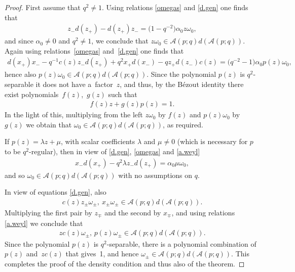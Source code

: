 \documentclass[10pt,a4paper]{amsart}
\numberwithin{equation}{section}
\def\AWeyl#1#2{{\mathcal{A}}(#1;#2)}
\begin{document}
\begin{proof}
First assume that $q^2\neq 1$. Using relations \eqref{omegas} and \eqref{d.gen} one f\/inds that
\begin{gather*}
z_-d(z_+) - d(z_+)z_- = \big(1-q^{-2}\big)\alpha_0 z\omega_0,
\end{gather*}
and since $\alpha_0 \neq 0$ and $q^2\neq 1$, we conclude that $z\omega_0 \in \AWeyl p q d (\AWeyl p q )$. Again using rela\-tions~\eqref{omegas} and~\eqref{d.gen} one f\/inds that
\begin{gather*}
d(x_+)x_- - q^{-1}c(z)z_-d(z_+) + q^2 x_+d(x_-) - qz_+ d(z_-)c(z) = \big(q^{-2}-1\big)\alpha_0 p(z)\omega_0,
\end{gather*}
hence also $p(z)\omega_0 \in \AWeyl p q d (\AWeyl p q )$. Since the polynomial $p(z)$ is $q^2$-separable it does not have a~factor~$z$, and thus, by the B\'ezout identity there exist polynomials~$f(z)$,~$g(z)$ such that
\begin{gather*}
f(z)z +g(z)p(z) = 1.
\end{gather*}
In the light of this, multiplying from the left $z\omega_0$ by $f(z)$ and $p(z)\omega_0$ by $g(z)$ we obtain that $\omega_0 \in \AWeyl p q d (\AWeyl p q )$, as required.

If $p(z)= \lambda z +\mu$, with scalar coef\/f\/icients $\lambda$ and $\mu\neq 0$ (which is necessary for $p$ to be $q^2$-regular), then in view of \eqref{d.gen}, \eqref{omegas} and \eqref{a.weyl}
\begin{gather*}
x_- d(x_+) - q^2\lambda z_-d(z_+) = \alpha_0\mu \omega_0,
\end{gather*}
and so $\omega_0 \in \AWeyl p q d (\AWeyl p q )$ with no assumptions on $q$.

In view of equations \eqref{d.gen}, also
\begin{gather*}
c(z)z_\pm \omega_\pm,\ x_\pm\omega_\pm \in \AWeyl p q d (\AWeyl p q ).
\end{gather*}
Multiplying the f\/irst pair by $z_\mp$ and the second by $x_\mp$, and using relations \eqref{a.weyl} we conclude that
\begin{gather*}
zc(z)\omega_\pm,\, p(z)\omega_\pm \in \AWeyl p q d (\AWeyl p q ).
\end{gather*}
Since the polynomial $p(z)$ is $q^2$-separable, there is a polynomial combination of~$p(z)$ and~$zc(z)$ that gives~1, and hence $\omega_\pm \in \AWeyl p q d (\AWeyl p q )$. This completes the proof of the density condition and thus also of the theorem.
\end{proof}
\end{document}
